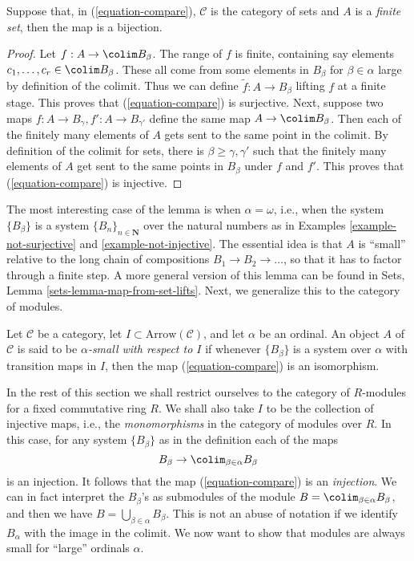 \begin{lemma}
\label{lemma-out-of-finite}
Suppose that, in (\ref{equation-compare}), $\mathcal{C}$ is the category
of sets and $A$ is a {\it finite set}, then the map is a bijection.
\end{lemma}

\begin{proof}
Let $f : A \to \colim B_\beta$.
The range of $f$ is finite, containing say
elements $c_1, \ldots, c_r \in \colim B_\beta$.
These all come from some elements in $B_\beta$ for $\beta \in \alpha$
large by definition of the colimit. Thus we can define
$\widetilde{f} : A \to B_\beta$ lifting $f$ at a finite stage.
This proves that (\ref{equation-compare}) is surjective.
Next, suppose two maps $f : A \to B_\gamma, f' : A \to B_{\gamma'}$
define the same map $A \to \colim B_\beta$.
Then each of the finitely many elements of $A$ gets sent to the same point in
the colimit. By definition of the colimit for sets, there is
$\beta \geq \gamma, \gamma'$ such that the finitely many elements of
$A$ get sent to the same points in $B_\beta$ under $f$ and $f'$.
This proves that (\ref{equation-compare}) is injective.
\end{proof}

\noindent
The most interesting case of the lemma is when $\alpha = \omega$, i.e.,
when the system $\{B_\beta\}$ is a system $\{B_n\}_{n \in \mathbf{N}}$
over the natural numbers as in
Examples \ref{example-not-surjective} and
\ref{example-not-injective}.
The essential idea is that $A$ is ``small'' relative to the long chain of
compositions $B_1 \to B_2 \to \ldots$, so that it has to factor through a
finite step. A more general version of this lemma can be found in
Sets, Lemma \ref{sets-lemma-map-from-set-lifts}.
Next, we generalize this to the category of modules.

\begin{definition}
\label{definition-small}
Let $\mathcal{C}$ be a category, let $I \subset \text{Arrow}(\mathcal{C})$,
and let $\alpha$ be an ordinal. An object $A$ of $\mathcal{C}$ is said to
be {\it $\alpha$-small with respect to $I$} if whenever $\{B_\beta\}$ is
a system over $\alpha$ with transition maps in $I$, then
the map (\ref{equation-compare}) is an isomorphism.
\end{definition}

\noindent
In the rest of this section we shall restrict ourselves
to the category of $R$-modules for a fixed commutative ring $R$.
We shall also take $I$ to be the collection of injective maps, i.e., the
{\it monomorphisms} in the category of modules over $R$. In this case, for
any system $\{B_\beta\}$ as in the definition each of the maps
$$
B_\beta \to \colim_{\beta \in \alpha} B_\beta
$$
is an injection. It follows that the map (\ref{equation-compare}) is an
{\it injection}. We can in fact interpret the $B_\beta$'s as submodules
of the module $B = \colim_{\beta \in \alpha} B_\beta$, and then we
have $B = \bigcup_{\beta \in \alpha} B_\beta$. This is not an abuse of
notation if we identify $B_\alpha$ with the image in the colimit.
We now want to show that modules are always small for ``large'' ordinals
$\alpha$.

